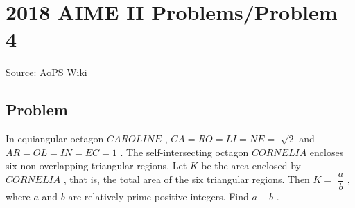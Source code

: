 \documentclass[12pt]{article}
\begin{document}
\section*{{2018 AIME II Problems/Problem 4}}
Source: AoPS Wiki

\subsection*{Problem}
In equiangular octagon $CAROLINE$ , $CA = RO = LI = NE =$ $\sqrt{2}$ and $AR = OL = IN = EC = 1$ . The self-intersecting octagon $CORNELIA$ encloses six non-overlapping triangular regions. Let $K$ be the area enclosed by $CORNELIA$ , that is, the total area of the six triangular regions. Then $K =$ $\dfrac{a}{b}$ , where $a$ and $b$ are relatively prime positive integers. Find $a + b$ .
\end{document}
